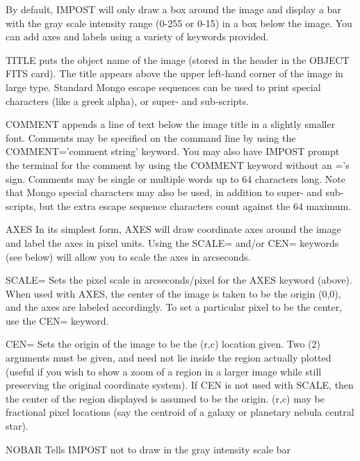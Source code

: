 By default, IMPOST will only draw a box around the image and display a bar
with the gray scale intensity range (0-255 or 0-15) in a box below the
image.  You can add axes and labels using a variety of keywords provided.
\begin{example}
  \item[TITLE]{puts the object name of the image (stored in the header in
          the OBJECT FITS card).  The title appears above the upper
          left-hand corner of the image in large type.  Standard 
          Mongo escape sequences can be used to print special characters
          (like a greek alpha), or super- and sub-scripts.}
  \item[COMMENT]{appends a line of text below the image title in a slightly
          smaller font.  Comments may be specified on the command line
          by using the COMMENT='comment string' keyword.  You may also
          have IMPOST prompt the terminal for the comment by using
          the COMMENT keyword without an ='s sign.  Comments may be 
          single or multiple words up to 64 characters long.  Note that
          Mongo special characters may also be used, in addition to 
          super- and sub-scripts, but the extra escape sequence characters
          count against the 64 maximum.}
  \item[AXES]{In its simplest form, AXES will draw coordinate axes around
          the image and label the axes in pixel units.  Using the
          SCALE= and/or CEN= keywords (see below) will allow you
          to scale the axes in arcseconds.}
  \item[SCALE= ]{Sets the pixel scale in arcseconds/pixel for the AXES 
          keyword (above).  When used with AXES, the center of
          the image is taken to be the origin (0,0), and the axes
          are labeled accordingly.  To set a particular pixel to be
          the center, use the CEN= keyword.}
  \item[CEN=]{Sets the origin of the image to be the (r,c) location given.
          Two (2) arguments must be given, and need not lie inside the
          region actually plotted (useful if you wish to show a zoom of
          a region in a larger image while still preserving the original
          coordinate system).  If CEN is not used with SCALE, then the
          center of the region displayed is assumed to be the origin.
          (r,c) may be fractional pixel locations (say the centroid of
          a galaxy or planetary nebula central star).}
  \item[NOBAR]{Tells IMPOST not to draw in the gray intensity scale bar
}
\end{example}
